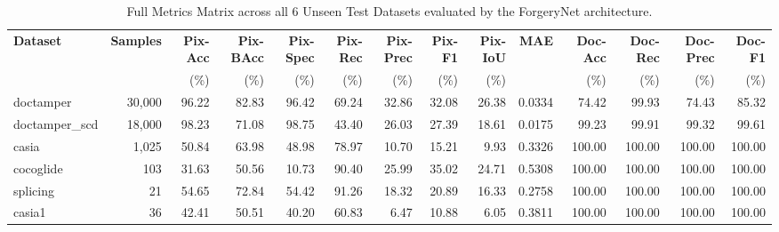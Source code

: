 
\begin{table}[t]
\centering
\scriptsize
\setlength{\tabcolsep}{3.5pt}
\caption{Full Metrics Matrix across all 6 Unseen Test Datasets evaluated by the ForgeryNet architecture.}
\label{tab:master_all_metrics}
\begin{tabular}{l r rrrrrrrr rrrr}
\toprule
\textbf{Dataset} & \textbf{Samples} & \textbf{Pix-Acc} & \textbf{Pix-BAcc} & \textbf{Pix-Spec} & \textbf{Pix-Rec} & \textbf{Pix-Prec} & \textbf{Pix-F1} & \textbf{Pix-IoU} & \textbf{MAE} & \textbf{Doc-Acc} & \textbf{Doc-Rec} & \textbf{Doc-Prec} & \textbf{Doc-F1} \\
& & (\%) & (\%) & (\%) & (\%) & (\%) & (\%) & (\%) & & (\%) & (\%) & (\%) & (\%) \\
\midrule
doctamper      & 30,000 & 96.22 & 82.83 & 96.42 & 69.24 & 32.86 & 32.08 & 26.38 & 0.0334 & 74.42  & 99.93 & 74.43  & 85.32 \\
doctamper\_scd & 18,000 & 98.23 & 71.08 & 98.75 & 43.40 & 26.03 & 27.39 & 18.61 & 0.0175 & 99.23  & 99.91 & 99.32  & 99.61 \\
casia          & 1,025  & 50.84 & 63.98 & 48.98 & 78.97 & 10.70 & 15.21 & 9.93  & 0.3326 & 100.00 & 100.00 & 100.00 & 100.00 \\
cocoglide      & 103    & 31.63 & 50.56 & 10.73 & 90.40 & 25.99 & 35.02 & 24.71 & 0.5308 & 100.00 & 100.00 & 100.00 & 100.00 \\
splicing       & 21     & 54.65 & 72.84 & 54.42 & 91.26 & 18.32 & 20.89 & 16.33 & 0.2758 & 100.00 & 100.00 & 100.00 & 100.00 \\
casia1         & 36     & 42.41 & 50.51 & 40.20 & 60.83 & 6.47  & 10.88 & 6.05  & 0.3811 & 100.00 & 100.00 & 100.00 & 100.00 \\
\bottomrule
\end{tabular}
\end{table}

